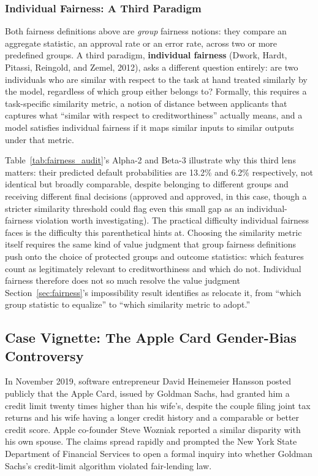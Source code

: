 \documentclass[../ai_in_finance]{subfiles}
\begin{document}
\subsubsection*{Individual Fairness: A Third Paradigm}

Both fairness definitions above are \emph{group} fairness notions: they compare an aggregate statistic, an approval rate or an error rate, across two or more predefined groups. A third paradigm, \textbf{individual fairness} (Dwork, Hardt, Pitassi, Reingold, and Zemel, 2012), asks a different question entirely: are two individuals who are similar with respect to the task at hand treated similarly by the model, regardless of which group either belongs to? Formally, this requires a task-specific similarity metric, a notion of distance between applicants that captures what ``similar with respect to creditworthiness'' actually means, and a model satisfies individual fairness if it maps similar inputs to similar outputs under that metric.

Table~\ref{tab:fairness_audit}'s Alpha-2 and Beta-3 illustrate why this third lens matters: their predicted default probabilities are 13.2\% and 6.2\% respectively, not identical but broadly comparable, despite belonging to different groups and receiving different final decisions (approved and approved, in this case, though a stricter similarity threshold could flag even this small gap as an individual-fairness violation worth investigating). The practical difficulty individual fairness faces is the difficulty this parenthetical hints at. Choosing the similarity metric itself requires the same kind of value judgment that group fairness definitions push onto the choice of protected groups and outcome statistics: which features count as legitimately relevant to creditworthiness and which do not. Individual fairness therefore does not so much resolve the value judgment Section~\ref{sec:fairness}'s impossibility result identifies as relocate it, from ``which group statistic to equalize'' to ``which similarity metric to adopt.''

\subsection{Case Vignette: The Apple Card Gender-Bias Controversy}
\label{sec:apple-card-vignette}

In November 2019, software entrepreneur David Heinemeier Hansson posted publicly that the Apple Card, issued by Goldman Sachs, had granted him a credit limit twenty times higher than his wife's, despite the couple filing joint tax returns and his wife having a longer credit history and a comparable or better credit score. Apple co-founder Steve Wozniak reported a similar disparity with his own spouse. The claims spread rapidly and prompted the New York State Department of Financial Services to open a formal inquiry into whether Goldman Sachs's credit-limit algorithm violated fair-lending law.
\end{document}
